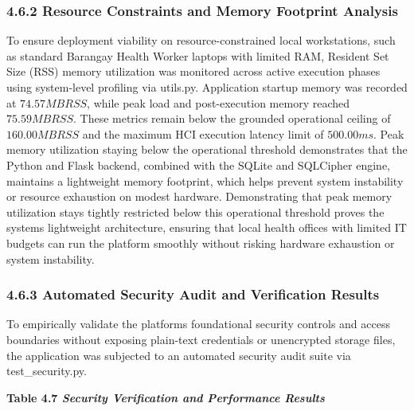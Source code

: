 \documentclass[
]{article}
\begin{document}
\subsubsection{\texorpdfstring{\textbf{4.6.2 Resource Constraints and
Memory Footprint
Analysis}}{4.6.2 Resource Constraints and Memory Footprint Analysis}}\label{resource-constraints-and-memory-footprint-analysis}

To ensure deployment viability on resource-constrained local
workstations, such as standard Barangay Health Worker laptops with
limited RAM, Resident Set Size (RSS) memory utilization was monitored
across active execution phases using system-level profiling via
utils.py. Application startup memory was recorded at \(74.57MBRSS\),
while peak load and post-execution memory reached \(75.59MBRSS\). These
metrics remain below the grounded operational ceiling of \(160.00MBRSS\)
and the maximum HCI execution latency limit of \(500.00ms\). Peak memory
utilization staying below the operational threshold demonstrates that
the Python and Flask backend, combined with the SQLite and SQLCipher
engine, maintains a lightweight memory footprint, which helps prevent
system instability or resource exhaustion on modest hardware.
Demonstrating that peak memory utilization stays tightly restricted
below this operational threshold proves the system\textquotesingle s
lightweight architecture, ensuring that local health offices with
limited IT budgets can run the platform smoothly without risking
hardware exhaustion or system instability.

\subsubsection{\texorpdfstring{\textbf{4.6.3 Automated Security Audit
and Verification Results}
}{4.6.3 Automated Security Audit and Verification Results }}\label{automated-security-audit-and-verification-results}

To empirically validate the platform\textquotesingle s foundational
security controls and access boundaries without exposing plain-text
credentials or unencrypted storage files, the application was subjected
to an automated security audit suite via test\_security.py.

\textbf{Table 4.7 \emph{Security Verification and Performance Results}}
\end{document}
